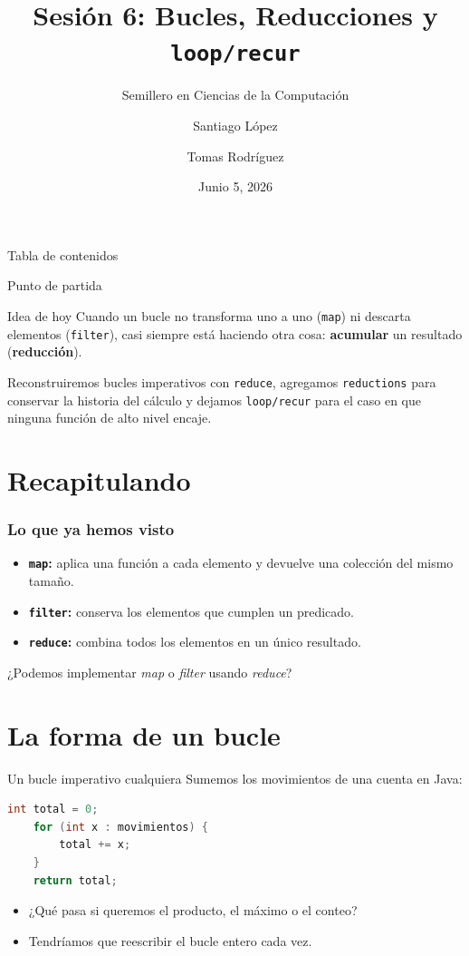 \documentclass{beamer}
\title{Sesión 6: Bucles, Reducciones y \texttt{loop/recur}}
\subtitle{Semillero en Ciencias de la Computación}
\author[Rodríguez, López]{Santiago López \and Tomas Rodríguez}
\date{Junio 5, 2026}
\begin{document}
\frame{\titlepage}

\begin{frame}{Tabla de contenidos}
    \tableofcontents    
\end{frame}

\begin{frame}{Punto de partida}
    \begin{block}{Idea de hoy}
        Cuando un bucle no transforma uno a uno (\texttt{map}) ni descarta elementos (\texttt{filter}), casi siempre está haciendo otra cosa: \textbf{acumular} un resultado (\textbf{reducción}).
    \end{block}

    \vspace{0.3cm}
    Reconstruiremos bucles imperativos con \texttt{reduce}, agregamos \texttt{reductions} para conservar la historia del cálculo y dejamos \texttt{loop/recur} para el caso en que ninguna función de alto nivel encaje.
\end{frame}

\section{Recapitulando}

\begin{frame}
\frametitle{Lo que ya hemos visto}
\begin{itemize}
    \item \textbf{\texttt{map}:} aplica una función a cada elemento y devuelve una colección del mismo tamaño.
    \item \textbf{\texttt{filter}:} conserva los elementos que cumplen un predicado.
    \item \textbf{\texttt{reduce}:} combina todos los elementos en un único resultado.
\end{itemize}
\vspace{0.3cm}
¿Podemos implementar \textit{map} o \textit{filter} usando \textit{reduce}?
\end{frame}

\section{La forma de un bucle}

\begin{frame}[fragile]{Un bucle imperativo cualquiera}
    Sumemos los movimientos de una cuenta en Java:

    \begin{lstlisting}[language=Java]
    int total = 0;
    for (int x : movimientos) {
        total += x;
    }
    return total;
    \end{lstlisting}

    \begin{itemize}
        \item ¿Qué pasa si queremos el producto, el máximo o el conteo?
        \item Tendríamos que reescribir el bucle entero cada vez.
    \end{itemize}
\end{frame}
\end{document}
